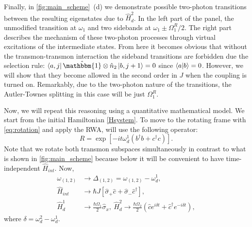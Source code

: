 \documentclass[%
 pra,
 amsmath,amssymb,
 reprint,%
]{revtex4-1}
\begin{document}
Finally, in \autoref{fig:main_scheme}~(d) we demonstrate possible two-photon transitions between the resulting eigenstates due to $\hat H_{d}^2$. In the left part of the panel, the unmodified transition at $\omega_1$ and two sidebands at $\omega_1 \pm \Omega_1^R/2$. The right part describes the mechanism of these two-photon processes through virtual excitations of the intermediate states. From here it becomes obvious that without the transmon-transmon interaction the sideband transitions are forbidden due the selection rule: $\bra{a,j}\hat{\mathbbm{1}}\otimes \hat n_2 \ket{b, j+1} = 0$ since $\braket{a}{b} = 0$. However, we will show that they become allowed in the second order in $J$ when the coupling is turned on.  Remarkably, due to the two-photon nature of the transitions, the Autler-Townes splitting in this case will be just $\Omega_1^R$.

Now, we will repeat this reasoning using a 
quantitative mathematical model. We start from 
the initial Hamiltonian \autoref{Hsystem}. To 
move to the rotating frame with 
\autoref{eq:rotation} and apply the RWA, will use 
the following operator:
\begin{equation}
R = \exp[-it \omega_d^1 
(b^{\dagger}b+c^{\dagger}c)].
\end{equation}  
Note that we rotate both transmon subspaces simultaneously in contrast to what is shown in \autoref{fig:main_scheme} because below it will be convenient to have time-independent $\hat H_{int}$. Now,
\begin{equation}
\begin{aligned}
\omega_{(1,2)} &\rightarrow \Delta_{(1,2)} = \omega_{(1,2)} - \omega_d^{1},\\
\hat H_{int} &\rightarrow  \hbar J \left[\hat \sigma_+ \hat c + \hat \sigma_-\hat c^\dag \right],\\
\hat H_{d}^1 &\rightarrow \frac{\hbar \Omega_1}{2} \hat \sigma_x,\ 
\hat H_{d}^2 \rightarrow \frac{\hbar \Omega_2}{2}(\hat c e^{i\delta t}  + \hat c^\dag e^{-i\delta t}),
\end{aligned}
\end{equation}
where $\delta = \omega_{d}^2 - \omega_{d}^1$.
\end{document}
